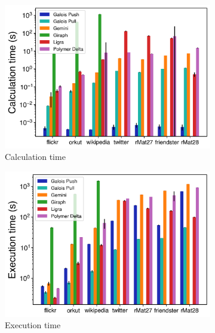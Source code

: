 \documentclass{meetings}
\begin{document}
\begin{figure}
	\hfil
	\begin{subfigure}{0.32\textwidth}
		\includegraphics[width=\linewidth]{../../plots/singleNodePR_calcTime.png}
		\caption{Calculation time}
		\label{fig:singleNodePR_calc}
	\end{subfigure}
	\hfil
	\begin{subfigure}{0.32\textwidth}
		\includegraphics[width=\linewidth]{../../plots/singleNodePR_execTime.png}
		\caption{Execution time}
		\label{fig:singleNodePR_exec}
	\end{subfigure}
	\hfil
	\begin{subfigure}{0.32\textwidth}

\end{subfigure}
\end{figure}
\end{document}
